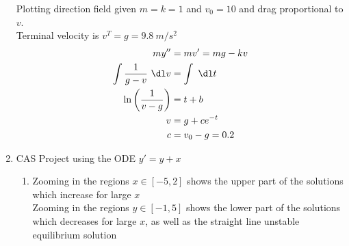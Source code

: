 \begin{enumerate}
          Plotting direction field given $m = k = 1$ and $v_{0} = 10$ and drag
          proportional to $v$. \\
          Terminal velocity is $v^{T} = g = 9.8\ m/s^{2}$
          \begin{align}
              my''                             & = mv' = mg - kv   \\
              \int \frac{1}{g - v}\ \dl v      & = \int \ \dl t    \\
              \ln \left(\frac{1}{v - g}\right) & = t + b           \\
              v                                & = g + c e^{-t}    \\
              c                                & = v_{0} - g = 0.2
          \end{align}

          \begin{figure}[H]
              \centering
          \end{figure}

    \item CAS Project using the ODE $y' = y + x$
          \begin{enumerate}
              \item Zooming in the regions $x \in [-5, 2]$ shows the upper part
                    of the solutions which increase for large $x$ \\
                    Zooming in the regions $y \in [-1, 5]$ shows the lower part
                    of the solutions which decreases for large $x$, as well as the
                    straight line unstable equilibrium solution


\end{enumerate}
\end{enumerate}

